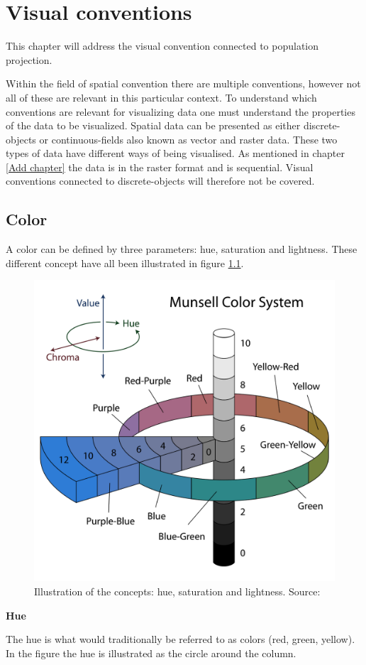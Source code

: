 \chapter{Visual conventions}\label{CVisualConventions}
This chapter will address the visual convention connected to population projection. 

Within the field of spatial convention there are multiple conventions, however not all of these are relevant in this particular context. To understand which conventions are relevant for visualizing data one must understand the properties of the data to be visualized. Spatial data can be presented as either discrete-objects or continuous-fields also known as vector and raster data. \citep{objectsNFields} These two types of data have different ways of being visualised. 
As mentioned in chapter \ref{Add chapter} the data is in the raster format and is sequential. Visual conventions connected to discrete-objects will therefore not be covered.




\section{Color}
A color can be defined by three parameters: hue, saturation and lightness. These different concept have all been illustrated in figure \ref{MunsellColorSystem}.

\begin{figure} [H]
	\centering
	\includegraphics[width=.4\textwidth]{Pictures/MunsellColorSystem}
	\caption{Illustration of the concepts: hue, saturation and lightness. Source: \citet{JacobRus}}
	\label{MunsellColorSystem}
\end{figure}

\textbf{Hue}

The hue is what would traditionally be referred to as colors (red, green, yellow). In the figure the hue is illustrated as the circle around the column.

